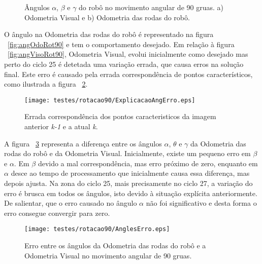 \begin{figure}[h!]
	\centering
	\qquad
	\caption{Ângulos $\alpha$, $\beta$ e $\gamma$ do robô  no movimento angular de 90 gruas. a) Odometria Visual e b) Odometria das rodas do robô.}
	\label{fig:angRot90}
\end{figure}


O ângulo na Odometria das rodas do robô é representado na figura ~\ref{fig:angOdoRot90} e tem o comportamento desejado. Em relação à figura ~\ref{fig:angVisoRot90}, Odometria Visual, evolui inicialmente como desejado mas perto do ciclo 25 é detetada uma variação errada, que causa erros na solução final. Este erro é causado pela errada correspondência de pontos característicos, como ilustrada a figura ~\ref{fig:ExplicAngErr}. 


\begin{figure}[h!]
	\begin{center}
		\leavevmode		
		\texttt{[image: testes/rotacao90/ExplicacaoAngErro.eps]}
		\caption{Errada correspondência dos pontos caracteristicos da imagem anterior \textit{k-1} e a atual \textit{k}.}
		\label{fig:ExplicAngErr}
	\end{center}
\end{figure}


A figura ~\ref{fig:AnglesErro} representa a diferença entre os ângulos $\alpha$, $\theta$ e $\gamma$ da Odometria das rodas do robô e da Odometria Visual. Inicialmente, existe um pequeno erro em $\beta$ e $\alpha$. Em $\beta$ devido a mal correspondência, mas erro próximo de zero, enquanto em $\alpha$ desce ao tempo de processamento que inicialmente causa essa diferença, mas depois ajusta. Na zona do ciclo 25, mais precisamente no ciclo 27, a variação do erro é brusca em todos os ângulos, isto devido à situação explícita anteriormente. De salientar, que o erro causado no ângulo $\alpha$ não foi significativo e desta forma o erro consegue convergir para zero.



\begin{figure}[h!]
	\begin{center}
		\leavevmode		
		\texttt{[image: testes/rotacao90/AnglesErro.eps]}
		\caption{Erro entre os ângulos da Odometria das rodas do robô e a Odometria Visual no movimento angular de 90 gruas.}
		\label{fig:AnglesErro}
	\end{center}
\end{figure}




